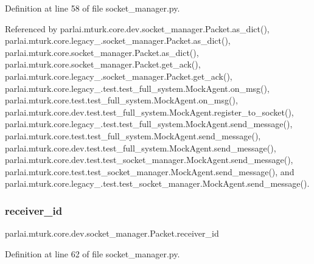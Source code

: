 Definition at line 58 of file socket\+\_\+manager.\+py.



Referenced by parlai.\+mturk.\+core.\+dev.\+socket\+\_\+manager.\+Packet.\+as\+\_\+dict(), parlai.\+mturk.\+core.\+legacy\+\_.\+socket\+\_\+manager.\+Packet.\+as\+\_\+dict(), parlai.\+mturk.\+core.\+socket\+\_\+manager.\+Packet.\+as\+\_\+dict(), parlai.\+mturk.\+core.\+socket\+\_\+manager.\+Packet.\+get\+\_\+ack(), parlai.\+mturk.\+core.\+legacy\+\_.\+socket\+\_\+manager.\+Packet.\+get\+\_\+ack(), parlai.\+mturk.\+core.\+legacy\+\_.\+test.\+test\+\_\+full\+\_\+system.\+Mock\+Agent.\+on\+\_\+msg(), parlai.\+mturk.\+core.\+test.\+test\+\_\+full\+\_\+system.\+Mock\+Agent.\+on\+\_\+msg(), parlai.\+mturk.\+core.\+dev.\+test.\+test\+\_\+full\+\_\+system.\+Mock\+Agent.\+register\+\_\+to\+\_\+socket(), parlai.\+mturk.\+core.\+legacy\+\_.\+test.\+test\+\_\+full\+\_\+system.\+Mock\+Agent.\+send\+\_\+message(), parlai.\+mturk.\+core.\+test.\+test\+\_\+full\+\_\+system.\+Mock\+Agent.\+send\+\_\+message(), parlai.\+mturk.\+core.\+dev.\+test.\+test\+\_\+full\+\_\+system.\+Mock\+Agent.\+send\+\_\+message(), parlai.\+mturk.\+core.\+dev.\+test.\+test\+\_\+socket\+\_\+manager.\+Mock\+Agent.\+send\+\_\+message(), parlai.\+mturk.\+core.\+test.\+test\+\_\+socket\+\_\+manager.\+Mock\+Agent.\+send\+\_\+message(), and parlai.\+mturk.\+core.\+legacy\+\_.\+test.\+test\+\_\+socket\+\_\+manager.\+Mock\+Agent.\+send\+\_\+message().

\mbox{\label{classparlai_1_1mturk_1_1core_1_1dev_1_1socket__manager_1_1Packet_af453648a5280b925750d4305dcd2404a}} 
\subsubsection{\texorpdfstring{receiver\+\_\+id}{receiver\_id}}
{\footnotesize\ttfamily parlai.\+mturk.\+core.\+dev.\+socket\+\_\+manager.\+Packet.\+receiver\+\_\+id}



Definition at line 62 of file socket\+\_\+manager.\+py.



